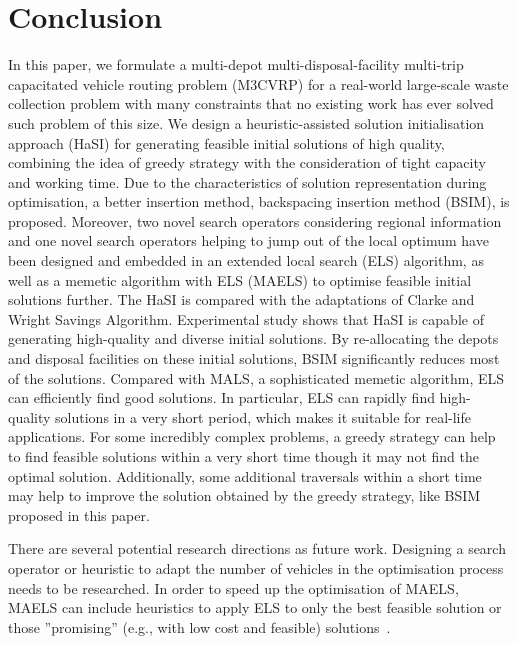 \documentclass[journal]{IEEEtran}
\begin{document}
\section{Conclusion}\label{sec:conclusion}
In this paper, we formulate a multi-depot multi-disposal-facility multi-trip capacitated vehicle routing problem (M3CVRP) for a real-world large-scale waste collection problem with many constraints that no existing work has ever solved such problem of this size. We design a heuristic-assisted solution initialisation approach (HaSI) for generating feasible initial solutions of high quality, combining the idea of greedy strategy with the consideration of tight capacity and working time. Due to the characteristics of solution representation during optimisation, a better insertion method, backspacing insertion method (BSIM), is proposed. Moreover, two novel search operators considering regional information and one novel search operators helping to jump out of the local optimum have been designed and embedded in an extended local search (ELS) algorithm, as well as a memetic algorithm with ELS (MAELS) to optimise feasible initial solutions further. The HaSI is compared with the adaptations of Clarke and Wright Savings Algorithm. Experimental study shows that HaSI is capable of generating high-quality and diverse initial solutions. By re-allocating the depots and disposal facilities on these initial solutions, BSIM significantly reduces most of the solutions. Compared with MALS, a sophisticated memetic algorithm, ELS can efficiently find good solutions. In particular, ELS can rapidly find high-quality solutions in a very short period, which makes it suitable for real-life applications. For some incredibly complex problems, a greedy strategy can help to find feasible solutions within a very short time though it may not find the optimal solution. Additionally, some additional traversals within a short time may help to improve the solution obtained by the greedy strategy, like BSIM proposed in this paper.


There are several potential research directions as future work. Designing a search operator or heuristic to adapt the number of vehicles in the optimisation process needs to be researched.  In order to speed up the optimisation of MAELS, MAELS can include heuristics to apply ELS to only the best feasible solution or those ''promising'' (e.g., with low cost and feasible) solutions~\cite{tang2009memetic}. %
\end{document}
